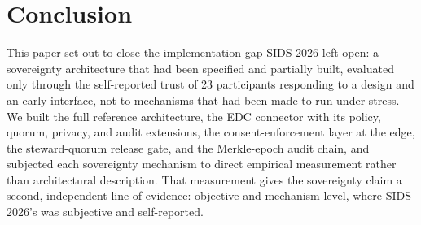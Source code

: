 \section{Conclusion}

This paper set out to close the implementation gap SIDS 2026 \cite{katrakazas2026} left open: a sovereignty architecture that had been specified and partially built, evaluated only through the self-reported trust of 23 participants responding to a design and an early interface, not to mechanisms that had been made to run under stress. We built the full reference architecture, the EDC connector with its policy, quorum, privacy, and audit extensions, the consent-enforcement layer at the edge, the steward-quorum release gate, and the Merkle-epoch audit chain, and subjected each sovereignty mechanism to direct empirical measurement rather than architectural description. That measurement gives the sovereignty claim a second, independent line of evidence: objective and mechanism-level, where SIDS 2026's was subjective and self-reported.

